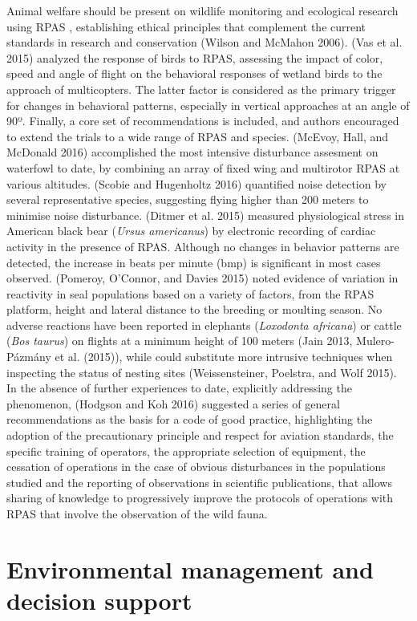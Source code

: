 \documentclass[]{interact}
\theoremstyle{plain}%
\theoremstyle{definition}
\theoremstyle{remark}
\begin{document}
Animal welfare should be present on wildlife monitoring and ecological
research using RPAS , establishing ethical principles that complement
the current standards in research and conservation (Wilson and McMahon
2006). (Vas et al. 2015) analyzed the response of birds to RPAS,
assessing the impact of color, speed and angle of flight on the
behavioral responses of wetland birds to the approach of multicopters.
The latter factor is considered as the primary trigger for changes in
behavioral patterns, especially in vertical approaches at an angle of
90º. Finally, a core set of recommendations is included, and authors
encouraged to extend the trials to a wide range of RPAS and species.
(McEvoy, Hall, and McDonald 2016) accomplished the most intensive
disturbance assesment on waterfowl to date, by combining an array of
fixed wing and multirotor RPAS at various altitudes. (Scobie and
Hugenholtz 2016) quantified noise detection by several representative
species, suggesting flying higher than 200 meters to minimise noise
disturbance. (Ditmer et al. 2015) measured physiological stress in
American black bear (\emph{Ursus americanus}) by electronic recording of
cardiac activity in the presence of RPAS. Although no changes in
behavior patterns are detected, the increase in beats per minute (bmp)
is significant in most cases observed. (Pomeroy, O'Connor, and Davies
2015) noted evidence of variation in reactivity in seal populations
based on a variety of factors, from the RPAS platform, height and
lateral distance to the breeding or moulting season. No adverse
reactions have been reported in elephants (\emph{Loxodonta africana}) or
cattle (\emph{Bos taurus}) on flights at a minimum height of 100 meters
(Jain 2013, Mulero-Pázmány et al. (2015)), while could substitute more
intrusive techniques when inspecting the status of nesting sites
(Weissensteiner, Poelstra, and Wolf 2015). In the absence of further
experiences to date, explicitly addressing the phenomenon, (Hodgson and
Koh 2016) suggested a series of general recommendations as the basis for
a code of good practice, highlighting the adoption of the precautionary
principle and respect for aviation standards, the specific training of
operators, the appropriate selection of equipment, the cessation of
operations in the case of obvious disturbances in the populations
studied and the reporting of observations in scientific publications,
that allows sharing of knowledge to progressively improve the protocols
of operations with RPAS that involve the observation of the wild fauna.

\section{Environmental management and decision
support}\label{environmental-management-and-decision-support}
\end{document}
